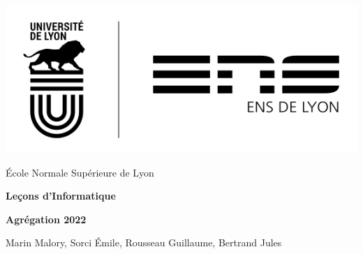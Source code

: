 \begin{titlepage}
    \noindent
\begin{flushright}
\vspace*{-3cm}
\includegraphics[scale=0.5]{Headers/logo-ens.png}
 
 \vspace{2cm}
\end{flushright}
    {\LARGE \textsf{École Normale Supérieure de Lyon} }
    \par
    \noindent
    \makebox[0pt][l]{\rule{1.3\textwidth}{1pt}}
    \par\medskip
    {\noindent \huge\textbf{\textsf{Leçons d'Informatique}}}
    \par\medskip
    {\noindent\huge\textbf{\textsf{Agrégation 2022} }}


    \par\vspace*{1cm}
    {\noindent\huge\textsf{Marin Malory, Sorci Émile, Rousseau Guillaume, Bertrand Jules} }
    

\vfill%

\end{titlepage}

\restoregeometry
\nopagecolor